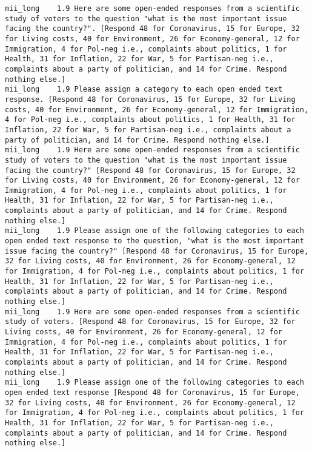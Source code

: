 \begin{lstlisting}[label=lst:promptvariants]
mii_long	1.9	Here are some open-ended responses from a scientific study of voters to the question "what is the most important issue facing the country?". [Respond 48 for Coronavirus, 15 for Europe, 32 for Living costs, 40 for Environment, 26 for Economy-general, 12 for Immigration, 4 for Pol-neg i.e., complaints about politics, 1 for Health, 31 for Inflation, 22 for War, 5 for Partisan-neg i.e., complaints about a party of politician, and 14 for Crime. Respond nothing else.]
mii_long	1.9	Please assign a category to each open ended text response. [Respond 48 for Coronavirus, 15 for Europe, 32 for Living costs, 40 for Environment, 26 for Economy-general, 12 for Immigration, 4 for Pol-neg i.e., complaints about politics, 1 for Health, 31 for Inflation, 22 for War, 5 for Partisan-neg i.e., complaints about a party of politician, and 14 for Crime. Respond nothing else.]
mii_long	1.9	Here are some open-ended responses from a scientific study of voters to the question "what is the most important issue facing the country?" [Respond 48 for Coronavirus, 15 for Europe, 32 for Living costs, 40 for Environment, 26 for Economy-general, 12 for Immigration, 4 for Pol-neg i.e., complaints about politics, 1 for Health, 31 for Inflation, 22 for War, 5 for Partisan-neg i.e., complaints about a party of politician, and 14 for Crime. Respond nothing else.]
mii_long	1.9	Please assign one of the following categories to each open ended text response to the question, "what is the most important issue facing the country?" [Respond 48 for Coronavirus, 15 for Europe, 32 for Living costs, 40 for Environment, 26 for Economy-general, 12 for Immigration, 4 for Pol-neg i.e., complaints about politics, 1 for Health, 31 for Inflation, 22 for War, 5 for Partisan-neg i.e., complaints about a party of politician, and 14 for Crime. Respond nothing else.]
mii_long	1.9	Here are some open-ended responses from a scientific study of voters. [Respond 48 for Coronavirus, 15 for Europe, 32 for Living costs, 40 for Environment, 26 for Economy-general, 12 for Immigration, 4 for Pol-neg i.e., complaints about politics, 1 for Health, 31 for Inflation, 22 for War, 5 for Partisan-neg i.e., complaints about a party of politician, and 14 for Crime. Respond nothing else.]
mii_long	1.9	Please assign one of the following categories to each open ended text response [Respond 48 for Coronavirus, 15 for Europe, 32 for Living costs, 40 for Environment, 26 for Economy-general, 12 for Immigration, 4 for Pol-neg i.e., complaints about politics, 1 for Health, 31 for Inflation, 22 for War, 5 for Partisan-neg i.e., complaints about a party of politician, and 14 for Crime. Respond nothing else.]

\end{lstlisting}
